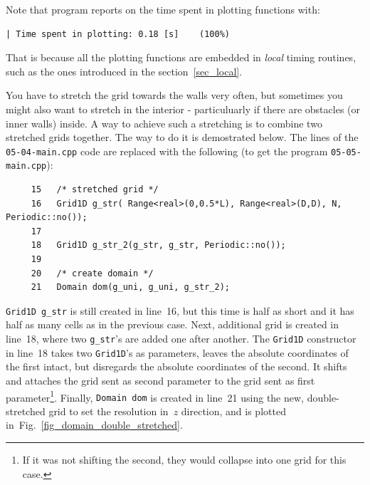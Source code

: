 Note that program reports on the time spent in plotting functions with:
%
{\small \begin{verbatim}
| Time spent in plotting: 0.18 [s]    (100%)
\end{verbatim}}
%
That is because all the plotting functions are embedded in {\em local} 
timing routines, such as the ones introduced in the section~\ref{sec_local}.

You have to stretch the grid towards the walls very often, but sometimes
you might also want to stretch in the interior - particuluarly if there
are obstacles (or inner walls) inside. A way to achieve such a stretching
is to combine two stretched grids together. The way to do it is demostrated
below. The lines of the {\tt 05-04-main.cpp} code are replaced with the 
following (to get the program {\tt 05-05-main.cpp}):
%
{\small \begin{verbatim}
     15   /* stretched grid */
     16   Grid1D g_str( Range<real>(0,0.5*L), Range<real>(D,D), N, Periodic::no());
     17
     18   Grid1D g_str_2(g_str, g_str, Periodic::no());
     19
     20   /* create domain */
     21   Domain dom(g_uni, g_uni, g_str_2);
\end{verbatim}}
%
{\tt Grid1D g\_str} is still created in line~16, but this time is half
as short and it has half as many cells as in the previous case. Next,
additional grid is created in line~18, where two {\tt g\_str}'s are
added one after another. The {\tt Grid1D} constructor in line~18 
takes two {\tt Grid1D}'s as parameters, leaves the absolute coordinates
of the first intact, but disregards the absolute coordinates of the second.
It shifts and attaches the grid sent as second parameter to the grid sent
as first parameter\footnote{If it was not shifting the second, they
would collapse into one grid for this case.}. 
Finally, {\tt Domain dom} is created in line~21 using the new,
double-stretched grid to set the resolution in~$z$ direction, and
is plotted in~Fig.~\ref{fig_domain_double_stretched}. 

